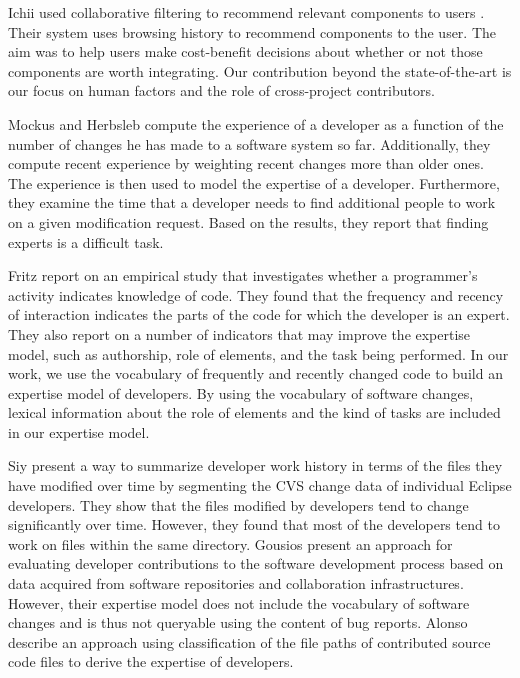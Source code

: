 Ichii \etal used collaborative filtering to recommend relevant components to users \cite{Ichi09a}. Their system uses browsing history to recommend components to the user. The aim was to help users make cost-benefit decisions about whether or not those components are worth integrating. Our contribution beyond the state-of-the-art is our focus on human factors and the role of cross-project contributors.

Mockus and Herbsleb \cite{Mock02b} compute the experience of a developer as a function of the number of changes he has made to a software system so far. Additionally, they compute recent experience by weighting recent changes more than older ones. The experience is then used to model the expertise of a developer. Furthermore, they examine the time that a developer needs to find additional people to work on a given modification request. Based on the results, they report that finding experts is a difficult task.

Fritz \etal \cite{Frit07a} report on an empirical study that investigates whether a programmer's activity indicates knowledge of code. They found that the frequency and recency of interaction  indicates the parts of the code for which the developer is an expert. They also report on a number of indicators that may improve the expertise model, such as authorship, role of elements, and the task being performed. In our work, we use the vocabulary of frequently and recently changed code to build an expertise model of developers. By using the vocabulary of software changes, lexical information about the role of elements and the kind of tasks are included in our expertise model.

Siy \etal \cite{Siy08a} present a way to summarize developer work history in terms of the files they have modified over time by segmenting the CVS change data of individual Eclipse developers. They show that the files modified by developers tend to change significantly over time. However, they found that most of the developers tend to work on files within the same directory. 
%
Gousios \etal \cite{Gous08a} present an approach for evaluating developer contributions to the software development process based on data acquired from software repositories and collaboration infrastructures. However, their expertise model does not include the vocabulary of software changes and is thus not queryable using the content of bug reports.
%
Alonso \etal \cite{Alon08a} describe an approach using classification of the file paths of contributed source code files to derive the expertise of developers. 

